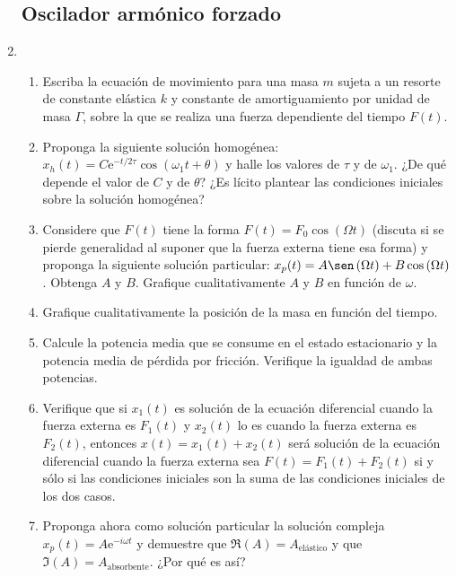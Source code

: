 \documentclass[11pt,spanish,a4paper]{article}
\begin{document}
\begin{enumerate}
\subsection*{Oscilador armónico forzado}

\item%
\begin{enumerate}
	\item Escriba la ecuación de movimiento para una masa $m$ sujeta a un resorte de constante elástica $k$ y constante de amortiguamiento por unidad de masa $\Gamma$, sobre la que se realiza una fuerza dependiente del tiempo $F(t)$. 
	\item Proponga la siguiente solución homogénea: $x_{h}(t)=C\mathrm{e}^{-t/2\tau}\cos\left(\omega_{1}t+\theta\right)$ y halle los valores de $\tau$ y de $\omega_{1}$.
	¿De qué depende el valor de $C$ y de $\theta$?
	¿Es lícito plantear las condiciones iniciales sobre la solución homogénea? 
 \item Considere que $F(t)$ tiene la forma $F(t)=F_{0}\cos\left(\Omega t\right)$ (discuta si se pierde generalidad al suponer que la fuerza externa tiene esa forma) y proponga la siguiente solución particular: $x_{p}(t)=A\sen\left(\Omega t\right)+B\cos\left(\Omega t\right)$.
Obtenga $A$ y $B$. Grafique cualitativamente $A$ y $B$ en función de $\omega$. 
	\item Grafique cualitativamente la posición de la masa en función del tiempo. 
	\item Calcule la potencia media que se consume en el estado estacionario y la potencia media de pérdida por fricción.
	Verifique la igualdad de ambas potencias. 
 \item Verifique que si $x_1(t)$ es solución de la ecuación diferencial cuando la fuerza externa es $F_1(t)$ y $x_2(t)$ lo es cuando la fuerza externa es $F_2(t)$, entonces $x(t)=x_1(t)+x_2(t)$ será solución de la ecuación diferencial cuando la fuerza externa sea $F(t)=F_1(t)+F_2(t)$ si y sólo si las condiciones iniciales son la suma de las condiciones iniciales de los dos casos. 
	\item Proponga ahora como solución particular la solución compleja $x_p(t)=A \mathrm{e}^{-i \omega t}$ y demuestre que $\Re (A)=A_\text{elástico}$ y que $\Im (A)= A_\mathrm{absorbente}$.
	¿Por qué es así?
\end{enumerate}




\end{enumerate}
\end{document}
